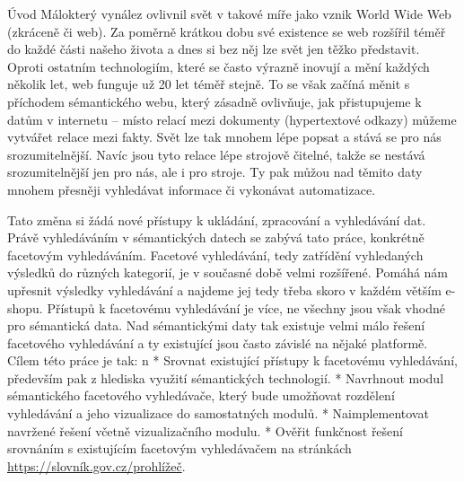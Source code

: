 \chap Úvod
Málokterý vynález ovlivnil svět v takové míře jako vznik World Wide Web (zkráceně  či web). 
Za poměrně krátkou dobu své existence se web rozšířil téměř do každé části našeho života a dnes si bez něj lze svět jen těžko představit. 
Oproti ostatním  technologiím, které se často výrazně inovují a mění každých několik let, web funguje už 20 let téměř stejně.
To se však začíná měnit s příchodem sémantického webu, který zásadně ovlivňuje, jak přistupujeme k datům v internetu – místo relací mezi dokumenty (hypertextové odkazy) můžeme vytvářet relace mezi fakty. 
Svět lze tak mnohem lépe popsat a stává se pro nás srozumitelnější. 
Navíc jsou tyto relace lépe strojově čitelné, takže se nestává srozumitelnější jen pro nás, ale i pro stroje. 
Ty pak můžou nad těmito daty mnohem přesněji vyhledávat informace či vykonávat automatizace. 


Tato změna si žádá nové přístupy k ukládání, zpracování a vyhledávání dat. 
Právě vyhledáváním v sémantických datech se zabývá tato práce, konkrétně facetovým vyhledáváním. 
Facetové vyhledávání, tedy zatřídění vyhledaných výsledků do různých kategorií, je v současné době velmi rozšířené. 
Pomáhá nám upřesnit výsledky vyhledávání a najdeme jej tedy třeba skoro v každém větším e-shopu. 
Přístupů k facetovému vyhledávání je více, ne všechny jsou však vhodné pro sémantická data. 
Nad sémantickými daty tak existuje velmi málo řešení facetového vyhledávání a ty existující jsou často závislé na nějaké platformě.
Cílem této práce je tak:
\begitems \style n
* Srovnat existující přístupy k facetovému vyhledávání, především pak z hlediska využití sémantických technologií.
* Navrhnout modul sémantického facetového vyhledávače, který bude umožňovat rozdělení vyhledávání a jeho vizualizace do samostatných modulů.
* Naimplementovat navržené řešení včetně vizualizačního modulu.
* Ověřit funkčnost řešení srovnáním s existujícím facetovým vyhledávačem na stránkách \url{https://slovník.gov.cz/prohlížeč}.
\enditems
